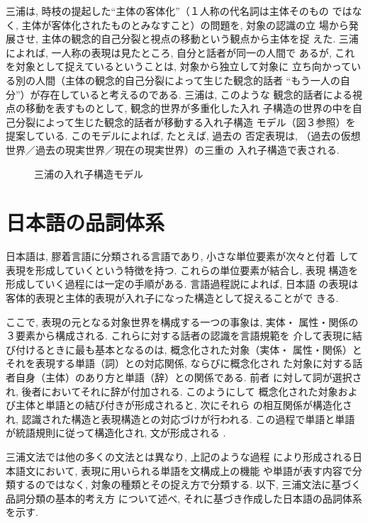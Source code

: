  三浦は, 時枝の提起した“主体の客体化”（１人称の代名詞は主体そのもの
ではなく, 主体が客体化されたものとみなすこと）の問題を, 対象の認識の立
場から発展させ, 主体の観念的自己分裂と視点の移動という観点から主体を捉
えた. 三浦によれば, 一人称の表現は見たところ, 自分と話者が同一の人間で
あるが, これを対象として捉えているということは, 対象から独立して対象に
立ち向かっている別の人間（主体の観念的自己分裂によって生じた観念的話者
“もう一人の自分”）が存在していると考えるのである. 三浦は, このような
観念的話者による視点の移動を表すものとして, 観念的世界が多重化した入れ
子構造の世界の中を自己分裂によって生じた観念的話者が移動する入れ子構造
モデル（図３参照）を提案している. このモデルによれば, たとえば, 過去の
否定表現は, （過去の仮想世界／過去の現実世界／現在の現実世界）の三重の
入れ子構造で表される. 
\begin{figure}
\begin{center}
	
	
	
\end{center}
\caption{三浦の入れ子構造モデル}\label{fig:miura2}
\end{figure}

\section{日本語の品詞体系}

 日本語は, 膠着言語に分類される言語であり, 小さな単位要素が次々と付着
して表現を形成していくという特徴を持つ. これらの単位要素が結合し, 表現
構造を形成していく過程には一定の手順がある. 言語過程説によれば, 日本語
の表現は客体的表現と主体的表現が入れ子になった構造として捉えることがで
きる. 

  ここで, 表現の元となる対象世界を構成する一つの事象は, 実体・
属性・関係の３要素から構成される. これらに対する話者の認識を言語規範を
介して表現に結び付けるときに最も基本となるのは, 概念化された対象（実体・
属性・関係）とそれを表現する単語（詞）との対応関係, ならびに概念化され
た対象に対する話者自身（主体）のあり方と単語（辞）との関係である. 前者
に対して詞が選択され, 後者においてそれに辞が付加される. このようにして
概念化された対象および主体と単語との結び付きが形成されると, 次にそれら
の相互関係が構造化され, 認識された構造と表現構造との対応づけが行われる. 
この過程で単語と単語が統語規則に従って構造化され, 文が形成される
\cite{Ikehara1990}. 

 三浦文法では他の多くの文法とは異なり, 上記のような過程
により形成される日本語文において, 表現に用いられる単語を文構成上の機能
や単語が表す内容で分類するのではなく, 対象の種類とその捉え方で分類する. 
以下, 三浦文法に基づく品詞分類の基本的考え方
\cite{Miyazaki1992a,Ikehara1990,Shirai1992}
について述べ, それに基づき作成した日本語の品詞体系を示す.

